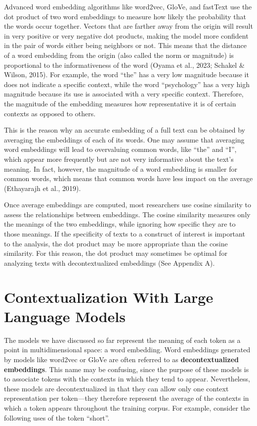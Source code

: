 \documentclass[
  man,
  floatsintext,
  longtable,
  nolmodern,
  notxfonts,
  notimes,
  colorlinks=true,linkcolor=blue,citecolor=blue,urlcolor=blue]{apa7}
\begin{document}
Advanced word embedding algorithms like word2vec, GloVe, and fastText
use the dot product of two word embeddings to measure how likely the
probability that the words occur together. Vectors that are farther away
from the origin will result in very positive or very negative dot
products, making the model more confident in the pair of words either
being neighbors or not. This means that the distance of a word embedding
from the origin (also called the norm or magnitude) is proportional to
the informativeness of the word (Oyama et al., 2023; Schakel \& Wilson,
2015). For example, the word ``the'' has a very low magnitude because it
does not indicate a specific context, while the word ``psychology'' has
a very high magnitude because its use is associated with a very specific
context. Therefore, the magnitude of the embedding measures how
representative it is of certain contexts as opposed to others.

This is the reason why an accurate embedding of a full text can be
obtained by averaging the embeddings of each of its words. One may
assume that averaging word embeddings will lead to overvaluing common
words, like ``the'' and ``I'', which appear more frequently but are not
very informative about the text's meaning. In fact, however, the
magnitude of a word embedding is smaller for common words, which means
that common words have less impact on the average (Ethayarajh et al.,
2019).

Once average embeddings are computed, most researchers use cosine
similarity to assess the relationships between embeddings. The cosine
similarity measures only the meanings of the two embeddings, while
ignoring how specific they are to those meanings. If the specificity of
texts to a construct of interest is important to the analysis, the dot
product may be more appropriate than the cosine similarity. For this
reason, the dot product may sometimes be optimal for analyzing texts
with decontextualized embeddings (See Appendix A).

\section{Contextualization With Large Language
Models}\label{contextualization-with-large-language-models}

The models we have discussed so far represent the meaning of each token
as a point in multidimensional space: a word embedding. Word embeddings
generated by models like word2vec or GloVe are often referred to as
\textbf{decontextualized embeddings}. This name may be confusing, since
the purpose of these models is to associate tokens with the contexts in
which they tend to appear. Nevertheless, these models are
decontextualized in that they can allow only one context representation
per token---they therefore represent the average of the contexts in
which a token appears throughout the training corpus. For example,
consider the following uses of the token ``short''.
\end{document}
